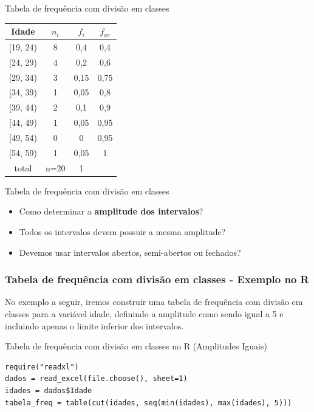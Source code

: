\begin{frame}{Tabela de frequência com divisão em classes} 
    \begin{table}[H]
        \begin{tabular}{cccc}
        \hline
        Idade      & $n_i$ & $f_i$ & $f_{ac}$ \\ \hline
        {[}19, 24) & 8     & 0,4   & 0,4      \\
        {[}24, 29) & 4     & 0,2   & 0,6      \\
        {[}29, 34) & 3     & 0,15  & 0,75     \\
        {[}34, 39) & 1     & 0,05  & 0,8      \\
        {[}39, 44) & 2     & 0,1   & 0,9      \\
        {[}44, 49) & 1     & 0,05  & 0,95     \\
        {[}49, 54) & 0     & 0     & 0,95     \\
        {[}54, 59) & 1     & 0,05  & 1        \\
        total      & n=20  &   1    &          \\ \hline
        \end{tabular}
        \end{table}
\end{frame}

\begin{frame}{Tabela de frequência  com divisão em classes} 
\begin{itemize}
    \item Como determinar a \textbf{amplitude dos intervalos}?
    \pause
    \item Todos os intervalos devem possuir a mesma amplitude?
    \pause
    \item Devemos usar intervalos abertos, semi-abertos ou fechados?
\end{itemize}
\end{frame}

\begin{frame}[fragile]
\frametitle{Tabela de frequência com divisão em classes - Exemplo no R}

No exemplo a seguir, iremos construir uma tabela de frequência com divisão em classes para a variável idade,
definindo a amplitude como sendo igual a 5 e incluindo apenas o limite inferior dos intervalos.

\begin{block}{Tabela de frequência  com divisão em classes no R (Amplitudes Iguais)}
\begin{verbatim}
require("readxl")
dados = read_excel(file.choose(), sheet=1) 
idades = dados$Idade
tabela_freq = table(cut(idades, seq(min(idades), max(idades), 5)))
\end{verbatim}
\end{block}
\end{frame}

